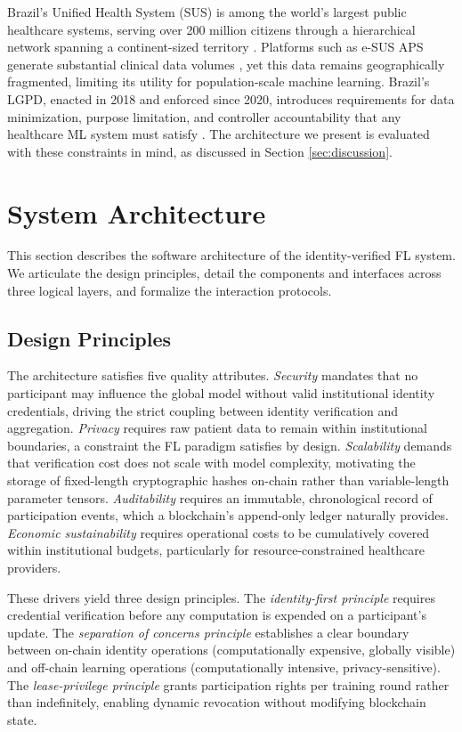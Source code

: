 \documentclass[english]{sbc2025}
\begin{document}
Brazil's Unified Health System (SUS) is among the world's largest public healthcare systems, serving over 200 million citizens through a hierarchical network spanning a continent-sized territory \citep{paim2011brazilian}. Platforms such as e-SUS APS generate substantial clinical data volumes \citep{Lacerda2020}, yet this data remains geographically fragmented, limiting its utility for population-scale machine learning. Brazil's LGPD, enacted in 2018 and enforced since 2020, introduces requirements for data minimization, purpose limitation, and controller accountability that any healthcare ML system must satisfy \citep{LGPD}. The architecture we present is evaluated with these constraints in mind, as discussed in Section \ref{sec:discussion}.


\section{System Architecture}
\label{sec:architecture}

This section describes the software architecture of the identity-verified FL system. We articulate the design principles, detail the components and interfaces across three logical layers, and formalize the interaction protocols.

\subsection{Design Principles}

The architecture satisfies five quality attributes. \textit{Security} mandates that no participant may influence the global model without valid institutional identity credentials, driving the strict coupling between identity verification and aggregation. \textit{Privacy} requires raw patient data to remain within institutional boundaries, a constraint the FL paradigm satisfies by design. \textit{Scalability} demands that verification cost does not scale with model complexity, motivating the storage of fixed-length cryptographic hashes on-chain rather than variable-length parameter tensors. \textit{Auditability} requires an immutable, chronological record of participation events, which a blockchain's append-only ledger naturally provides. \textit{Economic sustainability} requires operational costs to be cumulatively covered within institutional budgets, particularly for resource-constrained healthcare providers.

These drivers yield three design principles. The \textit{identity-first principle} requires credential verification before any computation is expended on a participant's update. The \textit{separation of concerns principle} establishes a clear boundary between on-chain identity operations (computationally expensive, globally visible) and off-chain learning operations (computationally intensive, privacy-sensitive). The \textit{lease-privilege principle} grants participation rights per training round rather than indefinitely, enabling dynamic revocation without modifying blockchain state.
\end{document}
